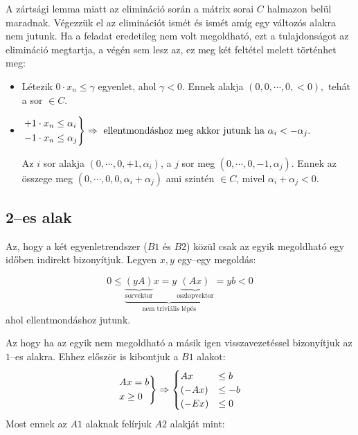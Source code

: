 A zártsági lemma miatt az elimináció során a mátrix sorai $C$ halmazon belül
maradnak. Végezzük el az eliminációt ismét és ismét amíg egy változós alakra nem
jutunk. Ha a feladat eredetileg nem volt megoldható, ezt a tulajdonságot az
elimináció megtartja, a végén sem lesz az, ez meg két feltétel melett történhet meg:

\begin{itemize}
  \item Létezik $0 \cdot x_n \leq \gamma$ egyenlet, ahol $\gamma < 0$. Ennek alakja 
  $(0,0, \cdots, 0, <0),$ tehát a sor $\in C$.
  \item $\begin{rcases}
  +1 \cdot x_n \leq \alpha_i \\ 
  -1 \cdot x_n \leq \alpha_j \\
  \end{rcases} \Rightarrow  \mbox{ ellentmondáshoz meg akkor jutunk ha }
  \alpha_i < -\alpha_j.$
  
  Az $i$ sor alakja $(0, \cdots, 0, +1, \alpha_i)$, a $j$ sor meg $(0, \cdots,
  0, -1, \alpha_j)$. Ennek az összege meg $(0, \cdots, 0, 0, \alpha_i+\alpha_j)$
  ami szintén $\in C$, mivel $\alpha_i+\alpha_j<0$.
\end{itemize}

\subsection{2--es alak}

Az, hogy a két egyenletrendszer ($B1$ és $B2$) közül csak az egyik megoldható
egy időben indirekt bizonyítjuk. Legyen $x,y$ egy--egy megoldás:

\[ 0 \leq \underbrace{
		   \underbrace{(yA)}_{\mbox{sorvektor}}x = 
		  y\underbrace{(Ax)}_{\mbox{oszlopvektor}}}
		  _{\mbox{nem triviális lépés}}=yb<0\] ahol ellentmondáshoz jutunk.

Az hogy ha az egyik nem megoldható a másik igen visszavezetéssel bizonyítjuk az
$1$--es alakra. Ehhez először is kibontjuk a $B1$ alakot:
\[ 
\begin{rcases}
Ax =b \\
x \geq 0
\end{rcases} \Rightarrow
\begin{cases}
A x    &\leq b \\
(-A x) &\leq -b \\
(-E x) &\leq 0
\end{cases}
\]
Most ennek az $A1$ alaknak felírjuk $A2$ alakját mint: 

